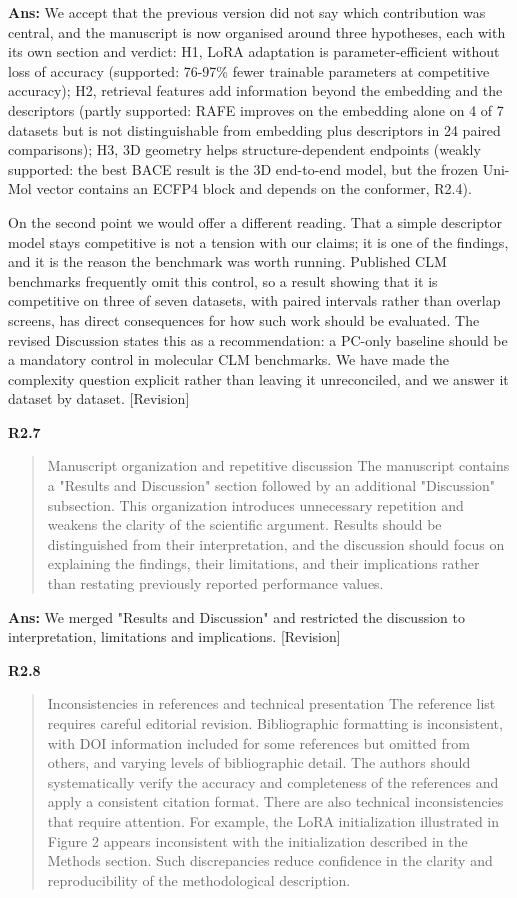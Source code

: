 \documentclass[
  10pt,
]{article}
\begin{document}
\textbf{Ans:} We accept that the previous version did not say which
contribution was central, and the manuscript is now organised around
three hypotheses, each with its own section and verdict: H1, LoRA
adaptation is parameter-efficient without loss of accuracy (supported:
76-97\% fewer trainable parameters at competitive accuracy); H2,
retrieval features add information beyond the embedding and the
descriptors (partly supported: RAFE improves on the embedding alone on 4
of 7 datasets but is not distinguishable from embedding plus descriptors
in 24 paired comparisons); H3, 3D geometry helps structure-dependent
endpoints (weakly supported: the best BACE result is the 3D end-to-end
model, but the frozen Uni-Mol vector contains an ECFP4 block and depends
on the conformer, R2.4).

On the second point we would offer a different reading. That a simple
descriptor model stays competitive is not a tension with our claims; it
is one of the findings, and it is the reason the benchmark was worth
running. Published CLM benchmarks frequently omit this control, so a
result showing that it is competitive on three of seven datasets, with
paired intervals rather than overlap screens, has direct consequences
for how such work should be evaluated. The revised Discussion states
this as a recommendation: a PC-only baseline should be a mandatory
control in molecular CLM benchmarks. We have made the complexity
question explicit rather than leaving it unreconciled, and we answer it
dataset by dataset. {[}Revision{]}

\textbf{R2.7}

\begin{quote}
Manuscript organization and repetitive discussion The manuscript
contains a "Results and Discussion" section followed by an additional
"Discussion" subsection. This organization introduces unnecessary
repetition and weakens the clarity of the scientific argument. Results
should be distinguished from their interpretation, and the discussion
should focus on explaining the findings, their limitations, and their
implications rather than restating previously reported performance
values.
\end{quote}

\textbf{Ans:} We merged "Results and Discussion" and restricted the
discussion to interpretation, limitations and implications.
{[}Revision{]}

\textbf{R2.8}

\begin{quote}
Inconsistencies in references and technical presentation The reference
list requires careful editorial revision. Bibliographic formatting is
inconsistent, with DOI information included for some references but
omitted from others, and varying levels of bibliographic detail. The
authors should systematically verify the accuracy and completeness of
the references and apply a consistent citation format. There are also
technical inconsistencies that require attention. For example, the LoRA
initialization illustrated in Figure 2 appears inconsistent with the
initialization described in the Methods section. Such discrepancies
reduce confidence in the clarity and reproducibility of the
methodological description.
\end{quote}
\end{document}
